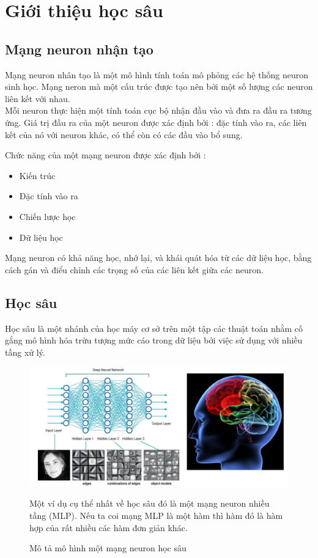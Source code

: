 \documentclass[a4paper,12pt]{report}
\begin{document}
\chapter{Giới thiệu học sâu}
\section{Mạng neuron nhận tạo}
Mạng neuron nhân tạo là một mô hình tính toán mô phỏng các hệ thống neuron sinh học. Mạng neron mà một cấu trúc được tạo nên bởi một số lượng các neuron liên kết với nhau.\\

Mỗi neuron thực hiện một tính toán cục bộ nhận đầu vào và đưa ra đầu ra tương ứng. Giá trị đầu ra của một neuron được xác định bởi : đặc tính vào ra, các liên kết của nó với neuron khác, có thể còn có các đầu vào bổ sung.

Chức năng của một  mạng neuron được xác định bởi :
\begin{itemize}
\item Kiến trúc
\item Đặc tính vào ra
\item Chiến lược học
\item Dữ liệu học 
\end{itemize}

Mạng neuron có khả năng học, nhớ lại, và khái quát hóa từ các dữ liệu học, bằng cách gán và điểu chỉnh các trọng số của các liên kết giữa các neuron.
\section{Học sâu}
Học sâu là một nhánh của học máy cơ sở trên một tập các thuật toán nhằm cố gắng mô hình hóa trừu tượng mức cáo trong dữ liệu bởi việc sử dụng với nhiều tầng xử lý. 

\begin{figure}[H]
\includegraphics[scale=0.45]{deeplearning.png}
\caption{Mô tả mô hình một mạng neuron học sâu}

Một ví dụ cụ thể nhất về học sâu đó là một mạng neuron nhiều tầng (MLP). Nếu ta coi mạng MLP là một hàm thì hàm đó là hàm hợp của rất nhiều các hàm đơn giản khác.
\end{figure}
\end{document}
